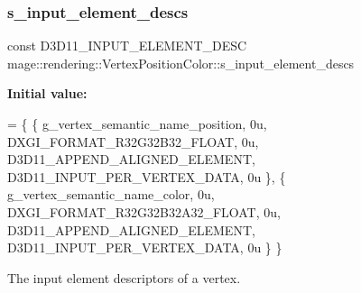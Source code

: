 \subsubsection{\texorpdfstring{s\+\_\+input\+\_\+element\+\_\+descs}{s\_input\_element\_descs}}
{\footnotesize\ttfamily const D3\+D11\+\_\+\+I\+N\+P\+U\+T\+\_\+\+E\+L\+E\+M\+E\+N\+T\+\_\+\+D\+E\+SC mage\+::rendering\+::\+Vertex\+Position\+Color\+::s\+\_\+input\+\_\+element\+\_\+descs\hspace{0.3cm}{\ttfamily [static]}}

{\bfseries Initial value\+:}
\begin{DoxyCode}
= \{
        \{ g\_vertex\_semantic\_name\_position, 0u, DXGI\_FORMAT\_R32G32B32\_FLOAT,    0u, 
      D3D11\_APPEND\_ALIGNED\_ELEMENT, D3D11\_INPUT\_PER\_VERTEX\_DATA, 0u \},
        \{ g\_vertex\_semantic\_name\_color,    0u, DXGI\_FORMAT\_R32G32B32A32\_FLOAT, 0u, 
      D3D11\_APPEND\_ALIGNED\_ELEMENT, D3D11\_INPUT\_PER\_VERTEX\_DATA, 0u \}
    \}
\end{DoxyCode}
The input element descriptors of a vertex. 